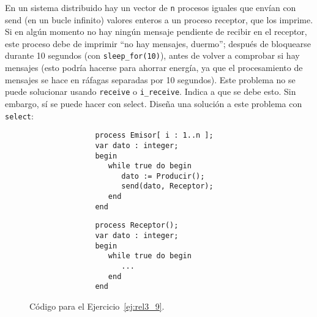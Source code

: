 \begin{ejercicio}\label{ej:rel3_9}
   En un sistema distribuido hay un vector de \verb|n| procesos iguales que envían con send (en un bucle infinito) valores enteros a un proceso receptor, que los imprime. Si en algún momento no hay ningún mensaje pendiente de recibir en el receptor, este proceso debe de imprimir ``no hay mensajes, duermo''; después de bloquearse durante 10 segundos (con \verb|sleep_for(10)|), antes de volver a comprobar si hay mensajes (esto podría hacerse para ahorrar energía, ya que el procesamiento de mensajes se hace en ráfagas separadas por 10 segundos). Este problema no se puede solucionar usando \verb|receive| o \verb|i_receive|. Indica a que se debe esto. Sin embargo, sí se puede hacer con select. Diseña una solución a este problema con \verb|select|:
    \begin{figure}[H]
       \centering
       \setlength{\columnsep}{1cm}
       \begin{multicols}{2}
           \begin{verbatim}
               process Emisor[ i : 1..n ];
               var dato : integer;
               begin
                  while true do begin
                     dato := Producir();
                     send(dato, Receptor);
                  end
               end
           \end{verbatim}
           \begin{verbatim}
               process Receptor();
               var dato : integer;
               begin
                  while true do begin
                     ...
                  end
               end
           \end{verbatim}
       \end{multicols}
       \caption{Código para el Ejercicio~\ref{ej:rel3_9}.}
       \label{fig:cod_9}
   \end{figure}
\end{ejercicio}

